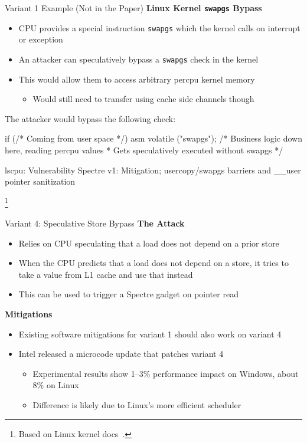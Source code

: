\documentclass[10pt, dvipsnames, aspectratio=169]{beamer}
\newcommand\ufootnote[1]{%
    \begingroup
        \renewcommand\thefootnote{}\footnote{\hspace{-1.8em}#1}%
        \addtocounter{footnote}{-1}%
    \endgroup
}
\begin{document}
\begin{frame}[c,fragile]{Variant 1 Example (Not in the Paper)}{}
  {\bf Linux Kernel {\tt swapgs} Bypass}
  \begin{itemize}
    \item CPU provides a special instruction {\tt swapgs} which the kernel calls on interrupt or exception
    \item An attacker can speculatively bypass a {\tt swapgs} check in the kernel
    \item This would allow them to access arbitrary percpu kernel memory
    \begin{itemize}
      \item Would still need to transfer using cache side channels though
    \end{itemize}
  \end{itemize}

  \vfill
  The attacker would bypass the following check:
  \begin{listing}[language=c,gobble=4,xleftmargin=1em]
    if (/* Coming from user space */)
      asm volatile ("swapgs");
    /* Business logic down here, reading percpu values
     * Gets speculatively executed without swapgs */
  \end{listing}

  \vfill
  \begin{listing}[language=none,gobble=4,xleftmargin=1em]
    lscpu:
    Vulnerability Spectre v1:        Mitigation; usercopy/swapgs barriers and __user pointer sanitization
  \end{listing}

  \ufootnote{Based on Linux kernel docs~\cite{linux_hwvuln}.}
\end{frame}

\begin{frame}[c,fragile]{Variant 4: Speculative Store Bypass}{}
  {\bf The Attack}
  \begin{itemize}
    \item Relies on CPU speculating that a load does not depend on a prior store
    \item When the CPU predicts that a load does not depend on a store, it tries to take a value from L1 cache and use that instead
    \item This can be used to trigger a Spectre gadget on pointer read
  \end{itemize}

  \vfill
  {\bf Mitigations}
  \begin{itemize}
    \item Existing software mitigations for variant 1 should also work on variant 4
    \item Intel released a microcode update that patches variant 4
    \begin{itemize}
      \item Experimental results show 1--3\% performance impact on Windows, about 8\% on Linux~\cite{variant4_performance}
      \item Difference is likely due to Linux's more efficient scheduler
    \end{itemize}
  \end{itemize}
\end{frame}
\end{document}
